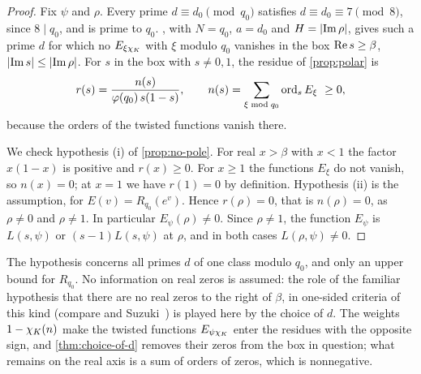 \begin{proof}
Fix $\psi$ and $\rho$. Every prime $d\equiv d_0\pmod{q_0}$ satisfies $d\equiv d_0\equiv7\pmod 8$,
since $8\mid q_0$, and is prime to $q_0$. , with $N=q_0$, $a=d_0$ and
$H=\lvert \operatorname{Im}\rho\rvert$, gives such a prime $d$ for which no $E_{\xi\chi_K}$ with $\xi$ modulo $q_0$
vanishes in the box $\operatorname{Re} s\ge\beta$, $\lvert \operatorname{Im} s\rvert\le\lvert \operatorname{Im}\rho\rvert$. For $s$ in the box with
$s\ne0,1$, the residue of \cref{prop:polar} is
\[
  r(s)=\frac{n(s)}{\varphi(q_0)\,s(1-s)},\qquad n(s)=\sum_{\xi\bmod q_0}\operatorname{ord}_s E_\xi\ \ge0,
\]
because the orders of the twisted functions vanish there.

We check hypothesis (i) of \cref{prop:no-pole}. For real $x>\beta$ with $x<1$ the factor $x(1-x)$ is
positive and $r(x)\ge0$. For $x\ge1$ the functions $E_\xi$ do not vanish, so $n(x)=0$; at $x=1$ we
have $r(1)=0$ by definition. Hypothesis (ii) is the assumption, for $E(v)=R_{q_0}(e^v)$. Hence
$r(\rho)=0$, that is $n(\rho)=0$, as $\rho\ne0$ and $\rho\ne1$. In particular $E_\psi(\rho)\ne0$. Since
$\rho\ne1$, the function $E_\psi$ is $L(s,\psi)$ or $(s-1)L(s,\psi)$ at $\rho$, and in both cases
$L(\rho,\psi)\neq0$.
\end{proof}

\begin{remark}\label{rem:criterion-hypothesis}
The hypothesis concerns all primes $d$ of one class modulo $q_0$, and only an upper bound for
$R_{q_0}$. No information on real zeros is assumed: the role of the familiar hypothesis that there are no
real zeros to the right of $\beta$, in one-sided criteria of this kind (compare
\cite[\S\S15.1--15.2]{MontgomeryVaughan2007} and Suzuki~\cite{Suzuki2024}) is played here by the
choice of $d$. The weights $1-\chi_K(n)$ make the twisted functions $E_{\psi\chi_K}$ enter the
residues with the opposite sign, and \cref{thm:choice-of-d} removes their zeros from the box in
question; what remains on the real axis is a sum of orders of zeros, which is nonnegative.
\end{remark}
